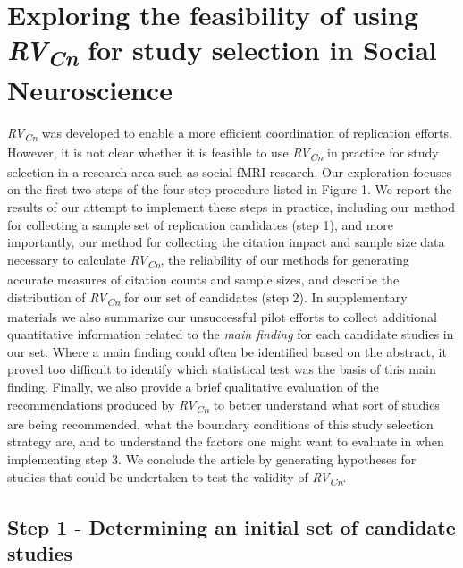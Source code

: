 \documentclass[
  man,floatsintext]{apa6}
\begin{document}
\hypertarget{exploring-the-feasibility-of-using-rvcn-for-study-selection-in-social-neuroscience}{%
\section{\texorpdfstring{Exploring the feasibility of using \emph{RV\textsubscript{Cn}} for study selection in Social Neuroscience}{Exploring the feasibility of using RVCn for study selection in Social Neuroscience}}\label{exploring-the-feasibility-of-using-rvcn-for-study-selection-in-social-neuroscience}}

\emph{RV\textsubscript{Cn}} was developed to enable a more efficient coordination of replication efforts. However, it is not clear whether it is feasible to use \emph{RV\textsubscript{Cn}} in practice for study selection in a research area such as social fMRI research. Our exploration focuses on the first two steps of the four-step procedure listed in Figure 1. We report the results of our attempt to implement these steps in practice, including our method for collecting a sample set of replication candidates (step 1), and more importantly, our method for collecting the citation impact and sample size data necessary to calculate \emph{RV\textsubscript{Cn}}, the reliability of our methods for generating accurate measures of citation counts and sample sizes, and describe the distribution of \emph{RV\textsubscript{Cn}} for our set of candidates (step 2). In supplementary materials we also summarize our unsuccessful pilot efforts to collect additional quantitative information related to the \emph{main finding} for each candidate studies in our set. Where a main finding could often be identified based on the abstract, it proved too difficult to identify which statistical test was the basis of this main finding. Finally, we also provide a brief qualitative evaluation of the recommendations produced by \emph{RV\textsubscript{Cn}} to better understand what sort of studies are being recommended, what the boundary conditions of this study selection strategy are, and to understand the factors one might want to evaluate in when implementing step 3. We conclude the article by generating hypotheses for studies that could be undertaken to test the validity of \emph{RV\textsubscript{Cn}}.

\hypertarget{step-1---determining-an-initial-set-of-candidate-studies}{%
\subsection{Step 1 - Determining an initial set of candidate studies}\label{step-1---determining-an-initial-set-of-candidate-studies}}
\end{document}

